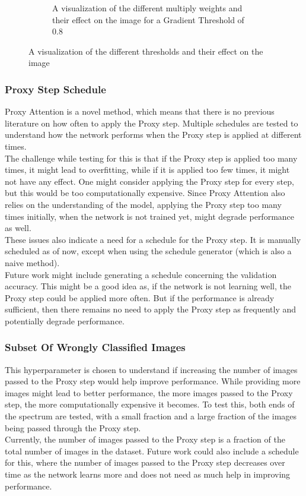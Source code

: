 \documentclass[a4paper,11pt,openright]{book}
\begin{document}
\begin{figure}[!htb]
\begin{subfigure}[b]{0.5\textwidth}
        \caption{A visualization of the different multiply weights and their effect on the image for a Gradient Threshold of 0.8}
        \label{fig:mults}
    \end{subfigure}
    \caption{A visualization of the different thresholds and their effect on the image}
    \label{fig:thresholds_and_mults}
\end{figure}

\subsubsection{Proxy Step Schedule} \label{sec:proxy_schedule}
Proxy Attention is a novel method, which means that there is no previous literature on how often to apply the Proxy step. Multiple schedules are tested to understand how the network performs when the Proxy step is applied at different times.\\
The challenge while testing for this is that if the Proxy step is applied too many times, it might lead to overfitting, while if it is applied too few times, it might not have any effect. One might consider applying the Proxy step for every step, but this would be too computationally expensive. Since Proxy Attention also relies on the understanding of the model, applying the Proxy step too many times initially, when the network is not trained yet, might degrade performance as well.\\
These issues also indicate a need for a schedule for the Proxy step. It is manually scheduled as of now, except when using the schedule generator (which is also a naive method).\\
Future work might include generating a schedule concerning the validation accuracy. This might be a good idea as, if the network is not learning well, the Proxy step could be applied more often. But if the performance is already sufficient, then there remains no need to apply the Proxy step as frequently and potentially degrade performance.


\subsubsection{Subset Of Wrongly Classified Images} \label{sec:subset_wrong}
This hyperparameter is chosen to understand if increasing the number of images passed to the Proxy step would help improve performance. While providing more images might lead to better performance, the more images passed to the Proxy step, the more computationally expensive it becomes. To test this, both ends of the spectrum are tested, with a small fraction and a large fraction of the images being passed through the Proxy step.\\
Currently, the number of images passed to the Proxy step is a fraction of the total number of images in the dataset. Future work could also include a schedule for this, where the number of images passed to the Proxy step decreases over time as the network learns more and does not need as much help in improving performance.
\end{document}

